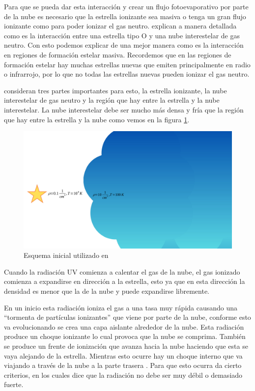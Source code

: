 \documentclass{book}
\begin{document}
Para que se pueda dar esta interacción y crear un flujo fotoevaporativo por parte de la nube es necesario que la estrella ionizante sea masiva o tenga un gran flujo ionizante como para poder ionizar el gas neutro. \cite{OortySpitzer_1955} explican a manera detallada como es la interacción entre una estrella tipo O y una nube interestelar de gas neutro. Con esto podemos explicar de una mejor manera como es la interacción en regiones de formación estelar masiva. Recordemos que en las regiones de formación estelar hay muchas estrellas nuevas que emiten principalmente en radio o infrarrojo, por lo que no todas las estrellas nuevas pueden ionizar el gas neutro.

\cite{OortySpitzer_1955} consideran tres partes importantes para esto, la estrella ionizante, la nube interestelar de gas neutro y la región que hay entre la estrella y la nube interestelar. La nube interestelar debe ser mucho más densa y fría que la región que hay entre la estrella y la nube como vemos en la figura \ref{kahn_zones}.

\begin{figure}[h]
    \centering
    \includegraphics[width= \textwidth]{artesanales/ImgFi01-5.pdf}
    \caption{Esquema inicial utilizado en \cite{Kahn:1954}}
    \label{kahn_zones}
\end{figure}

Cuando la radiación UV comienza a calentar el gas de la nube, el gas ionizado comienza a expandirse en dirección a la estrella, esto ya que en esta dirección la densidad es menor que la de la nube y puede expandirse libremente. 

En un inicio esta radiación ioniza el gas a una tasa muy rápida causando una ``tormenta de partículas ionizantes'' que viene por parte de la nube, conforme esto va evolucionando se crea una capa aislante alrededor de la nube. Esta radiación produce un choque ionizante lo cual provoca que la nube se comprima. También se produce un frente de ionización que avanza hacia la nube haciendo que esta se vaya alejando de la estrella. Mientras esto ocurre hay un choque interno que va viajando a través de la nube a la parte trasera \citep{Bertoldi_1989}. Para que esto ocurra \cite{Kahn:1954} da cierto criterios, en los cuales dice que la radiación no debe ser muy débil o demasiado fuerte.
\end{document}
